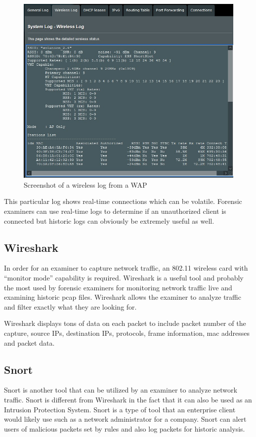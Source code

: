 \documentclass[acmlarge]{acmart}
\begin{document}
\begin{figure}[H]
 \centering
  \includegraphics[width=0.5\linewidth]{imgs/waplog.jpg}
  \caption{Screenshot of a wireless log from a WAP}
  \label{fig:waplog}
\end{figure}

This particular log shows real-time connections which can be volatile. Forensic examiners can use real-time logs to determine if an unauthorized client is connected but historic logs can obviously be extremely useful as well. 

\subsection{Wireshark}

In order for an examiner to capture network traffic, an 802.11 wireless card with “monitor mode” capability is required. Wireshark is a useful tool and probably the most used by forensic examiners for monitoring network traffic live and examining historic pcap files. Wireshark allows the examiner to analyze traffic and filter exactly what they are looking for. 


Wireshark displays tons of data on each packet to include packet number of the capture, source IPs, destination IPs, protocols, frame information, mac addresses and packet data. 

\subsection{Snort}

Snort is another tool that can be utilized by an examiner to analyze network traffic. Snort is different from Wireshark in the fact that it can also be used as an Intrusion Protection System. Snort is a type of tool that an enterprise client would likely use such as a network administrator for a company. Snort can alert users of malicious packets set by rules and also log packets for historic analysis. 
\end{document}
